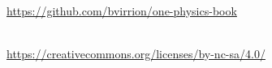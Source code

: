 \thispagestyle{empty}
\vspace*{\fill}
\begin{center}
\omcolophonsource\\[2pt]
\url{https://github.com/bvirrion/one-physics-book}

\bigskip
\omcolophonlicense\\[2pt]
\url{https://creativecommons.org/licenses/by-nc-sa/4.0/}\\[6pt]
\omcolophoncredit
\end{center}
\vspace*{\fill}
\clearpage
